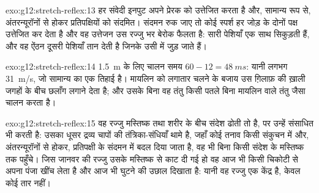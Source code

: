 \begin{solution}{exo:g12:stretch-reflex:13}
हर संवेदी इनपुट अपने प्रेरक  को उत्तेजित करता है और, सामान्य रूप
से, अंतरन्यूरॉनों से होकर प्रतिपक्षियों को संदमित। संदमन रुक जाए तो कोई
स्पर्श हर जोड़ के दोनों पक्ष उत्तेजित कर देता है और वह उत्तेजन उस रज्जु भर
बेरोक फैलता है: सारी पेशियाँ एक साथ सिकुड़ती हैं, और वह ऐंठन दूसरी पेशियाँ
तान देती है जिनके  उसी में जुड़ जाते हैं।
\end{solution}

\begin{solution}{exo:g12:stretch-reflex:14}
\qty{1.5}{m} के लिए चालन समय $60 - 12 = \qty{48}{ms}$: यानी लगभग
\qty{31}{m/s}, जो सामान्य का एक तिहाई है। मायलिन  को लगातार चलने
के बजाय उस ग़िलाफ़ की ख़ाली जगहों के बीच छलाँग लगाने देता है; और उसके बिना
वह तंतु किसी पतले बिना मायलिन वाले तंतु जैसा चालन करता है।
\end{solution}

\begin{solution}{exo:g12:stretch-reflex:15}
वह रज्जु मस्तिष्क तथा शरीर के बीच संदेश ढोती तो है, पर उन्हें संसाधित भी
करती है: उसका धूसर द्रव्य  चापों की तंत्रिका-संधियाँ थामे है, जहाँ
कोई तनाव किसी संकुचन में और, अंतरन्यूरॉनों से होकर, प्रतिपक्षी के संदमन में
बदल दिया जाता है, वह भी बिना किसी संदेश के मस्तिष्क तक पहुँचे। जिस जानवर की
रज्जु उसके मस्तिष्क से काट दी गई हो वह आज भी किसी चिकोटी से अपना पंजा खींच
लेता है और आज भी घुटने की उछाल दिखाता है: यानी वह रज्जु एक केंद्र है, केवल
कोई तार नहीं।
\end{solution}

